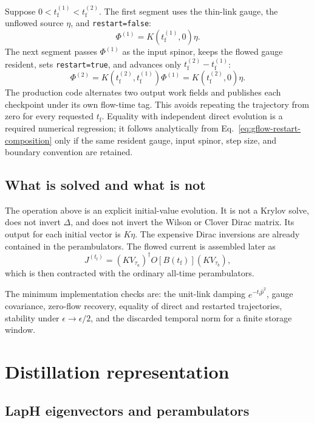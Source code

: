 \documentclass[11pt]{article}
\numberwithin{equation}{section}
\newcommand{\tf}{t_{\mathrm f}}
\begin{document}
Suppose \(0<\tf^{(1)}<\tf^{(2)}\).  The first segment uses the thin-link gauge,
the unflowed source \(\eta\), and \texttt{restart=false}:
\begin{equation}
  \Phi^{(1)}=K(\tf^{(1)},0)\eta.
\end{equation}
The next segment passes \(\Phi^{(1)}\) as the input spinor, keeps the flowed
gauge resident, sets \texttt{restart=true}, and advances only
\(\tf^{(2)}-\tf^{(1)}\):
\begin{equation}
  \Phi^{(2)}
  =K(\tf^{(2)},\tf^{(1)})\Phi^{(1)}
  =K(\tf^{(2)},0)\eta.
  \label{eq:gflow-restart-composition}
\end{equation}
The production code alternates two output work fields and publishes each
checkpoint under its own flow-time tag.  This avoids repeating the trajectory
from zero for every requested \(\tf\).  Equality with independent direct
evolution is a required numerical regression; it follows analytically from
Eq.~\eqref{eq:gflow-restart-composition} only if the same resident gauge,
input spinor, step size, and boundary convention are retained.

\subsection{What is solved and what is not}

The operation above is an explicit initial-value evolution.  It is not a
Krylov solve, does not invert \(\Delta\), and does not invert the Wilson or
Clover Dirac matrix.  Its output for each initial vector is
\(K\eta\).  The expensive Dirac inversions are already contained in the
perambulators.  The flowed current is assembled later as
\begin{equation}
  J^{(\tf)}
  =
  (KV_{\tau_a})^\dagger
  O[B(\tf)]
  (KV_{\tau_b}),
\end{equation}
which is then contracted with the ordinary all-time perambulators.

The minimum implementation checks are: the unit-link damping
\(e^{-\tf\widehat p^2}\), gauge covariance, zero-flow recovery, equality of
direct and restarted trajectories, stability under
\(\epsilon\to\epsilon/2\), and the discarded temporal norm for a finite
storage window.

\section{Distillation representation}

\subsection{LapH eigenvectors and perambulators}
\end{document}
